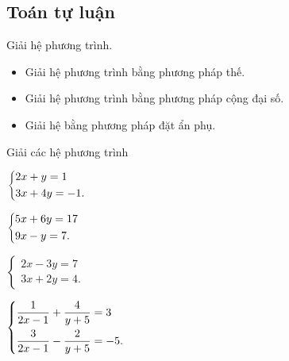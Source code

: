 \subsection{Toán tự luận}

\begin{dang}{Giải hệ phương trình.}
	\begin{itemize}
		\item  Giải hệ phương trình bằng phương pháp thế. 
		\item  Giải hệ phương trình bằng phương pháp cộng đại số.
		\item  Giải hệ bằng phương pháp đặt ẩn phụ.
	\end{itemize}
	
\end{dang}
\begin{bt}
	Giải các hệ phương trình	
	\begin{enumEX}{2}  
		\item $\left\{\begin{aligned}&2x+y=1\\&3x+4y=-1.\end{aligned}\right.$
		\item $\left\{\begin{aligned}&5x+6y=17\\&9x-y=7.\end{aligned}\right.$
		\item $\begin{cases}
		2x-3y = 7 \\
		3x + 2y = 4. 
		\end{cases}$  
		\item $\left\{\begin{aligned}&\dfrac{1}{2x - 1} + \dfrac{4}{y + 5} = 3\\&\dfrac{3}{2x - 1} - \dfrac{2}{y + 5} =  - 5.\end{aligned}\right.$
	\end{enumEX}
\end{bt}
